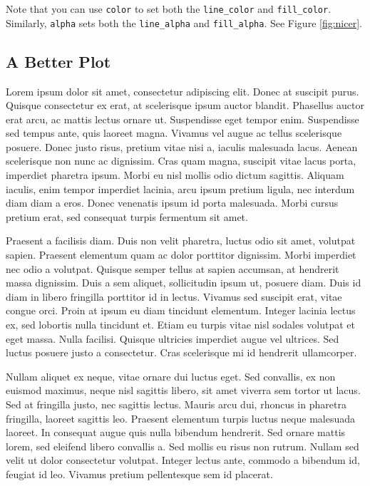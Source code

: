 \documentclass[11pt]{article}
\begin{document}
    
    
    Note that you can use \texttt{color} to set both the
\texttt{line\_color} and \texttt{fill\_color}. Similarly, \texttt{alpha}
sets both the \texttt{line\_alpha} and \texttt{fill\_alpha}. See Figure
\ref{fig:nicer}.

    
    
    \subsection{A Better Plot}\label{a-better-plot}

    Lorem ipsum dolor sit amet, consectetur adipiscing elit. Donec at
suscipit purus. Quisque consectetur ex erat, at scelerisque ipsum auctor
blandit. Phasellus auctor erat arcu, ac mattis lectus ornare ut.
Suspendisse eget tempor enim. Suspendisse sed tempus ante, quis laoreet
magna. Vivamus vel augue ac tellus scelerisque posuere. Donec justo
risus, pretium vitae nisi a, iaculis malesuada lacus. Aenean scelerisque
non nunc ac dignissim. Cras quam magna, suscipit vitae lacus porta,
imperdiet pharetra ipsum. Morbi eu nisl mollis odio dictum sagittis.
Aliquam iaculis, enim tempor imperdiet lacinia, arcu ipsum pretium
ligula, nec interdum diam diam a eros. Donec venenatis ipsum id porta
malesuada. Morbi cursus pretium erat, sed consequat turpis fermentum sit
amet.

Praesent a facilisis diam. Duis non velit pharetra, luctus odio sit
amet, volutpat sapien. Praesent elementum quam ac dolor porttitor
dignissim. Morbi imperdiet nec odio a volutpat. Quisque semper tellus at
sapien accumsan, at hendrerit massa dignissim. Duis a sem aliquet,
sollicitudin ipsum ut, posuere diam. Duis id diam in libero fringilla
porttitor id in lectus. Vivamus sed suscipit erat, vitae congue orci.
Proin at ipsum eu diam tincidunt elementum. Integer lacinia lectus ex,
sed lobortis nulla tincidunt et. Etiam eu turpis vitae nisl sodales
volutpat et eget massa. Nulla facilisi. Quisque ultricies imperdiet
augue vel ultrices. Sed luctus posuere justo a consectetur. Cras
scelerisque mi id hendrerit ullamcorper.

Nullam aliquet ex neque, vitae ornare dui luctus eget. Sed convallis, ex
non euismod maximus, neque nisl sagittis libero, sit amet viverra sem
tortor ut lacus. Sed at fringilla justo, nec sagittis lectus. Mauris
arcu dui, rhoncus in pharetra fringilla, laoreet sagittis leo. Praesent
elementum turpis luctus neque malesuada laoreet. In consequat augue quis
nulla bibendum hendrerit. Sed ornare mattis lorem, sed eleifend libero
convallis a. Sed mollis eu risus non rutrum. Nullam sed velit ut dolor
consectetur volutpat. Integer lectus ante, commodo a bibendum id,
feugiat id leo. Vivamus pretium pellentesque sem id placerat.
\end{document}
